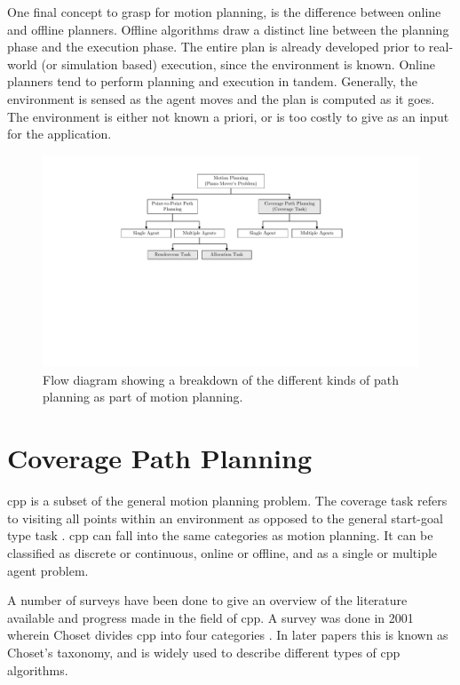 One final concept to grasp for motion planning, is the difference between online and offline planners. Offline algorithms draw a distinct line between the planning phase and the execution phase. The entire plan is already developed prior to real-world (or simulation based) execution, since the environment is known. Online planners tend to perform planning and execution in tandem. Generally, the environment is sensed as the agent moves and the plan is computed as it goes. The environment is either not known a priori, or is too costly to give as an input for the application. \cite{AIbook}
\begin{figure}[h!]
\centering
\includegraphics[width=\textwidth,trim={7cm 8.5cm 6.5cm 1.5cm},clip]{figs/Motion.pdf} %
\caption{Flow diagram showing a breakdown of the different kinds of path planning as part of motion planning.}
\label{fig:MotionPlanning}
\end{figure}
\section{Coverage Path Planning}
\label{sec:LR-CPP}
\ac{cpp} is a subset of the general motion planning problem. The coverage task refers to visiting all points within an environment as opposed to the general start-goal type task \cite{Zhang2020}. \ac{cpp} can fall into the same categories as motion planning. It can be classified as discrete or continuous, online or offline, and as a single or multiple agent problem.

A number of surveys have been done to give an overview of the literature available and progress made in the field of \ac{cpp}. A survey was done in 2001 wherein Choset divides \ac{cpp} into four categories \cite{Choset2001}. In later papers this is known as Choset's taxonomy, and is widely used to describe different types of \ac{cpp} algorithms.

